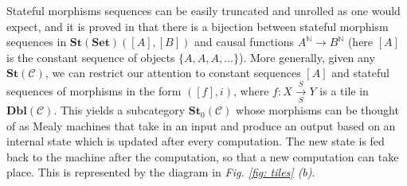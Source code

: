 \documentclass[11pt,a4paper,openright,twoside]{report}
\theoremstyle{plain}
\theoremstyle{definition}
\begin{document}
Stateful morphisms sequences can be easily truncated and unrolled as one would expect, and it is proved in \cite{sprunger2019differentiable} that there is a bijection between stateful morphism sequences in $\mathbf{St}(\mathbf{Set})([A],[B])$ and causal functions $A^{\mathbb{N}} \to B^{\mathbb{N}}$ (here $[A]$ is the constant sequence of objects $\{A,A,A,\dots\}$). More generally, given any $\mathbf{St}(\mathcal{C})$, we can restrict our attention to constant sequences $[A]$ and stateful sequences of morphisms in the form $([f],i)$, where $f:X \overset{S}{\underset{S}\longrightarrow} Y$ is a tile in $\mathbf{Dbl}(\mathcal{C})$. This yields a subcategory $\mathbf{St}_0(\mathcal{C})$ whose morphisms can be thought of as Mealy machines that take in an input and produce an output based on an internal state which is updated after every computation. The new state is fed back to the machine after the computation, so that a new computation can take place. This is represented by the diagram in \textit{Fig. \ref{fig: tiles} (b)}.
\end{document}
